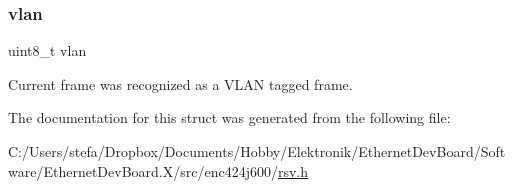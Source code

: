 \mbox{\label{struct_r_s_v_a1658beabbd0704b4ab87c15e91efe371}} 
\subsubsection{\texorpdfstring{vlan}{vlan}}
{\footnotesize\ttfamily uint8\+\_\+t vlan}



Current frame was recognized as a V\+L\+AN tagged frame. 



The documentation for this struct was generated from the following file\+:\begin{DoxyCompactItemize}
\item 
C\+:/\+Users/stefa/\+Dropbox/\+Documents/\+Hobby/\+Elektronik/\+Ethernet\+Dev\+Board/\+Software/\+Ethernet\+Dev\+Board.\+X/src/enc424j600/\mbox{\hyperlink{rsv_8h}{rsv.\+h}}\end{DoxyCompactItemize}
